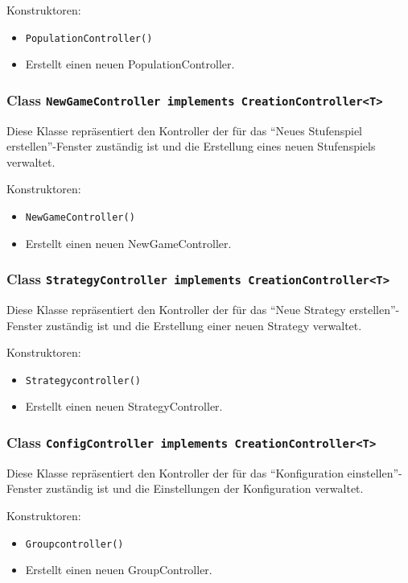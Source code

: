 \documentclass[parskip=full,11pt]{scrartcl}
\begin{document}
Konstruktoren:
\begin{itemize}\itemsep -10pt
\item \texttt{PopulationController()}
\item[] Erstellt einen neuen PopulationController.
\end{itemize}

\subsubsection{Class \texttt{NewGameController implements CreationController<T>}}
Diese Klasse repräsentiert den Kontroller der für das \enquote{Neues Stufenspiel erstellen}-Fenster zuständig ist und die Erstellung eines neuen Stufenspiels verwaltet.

Konstruktoren:
\begin{itemize}\itemsep -10pt
\item \texttt{NewGameController()}
\item[] Erstellt einen neuen NewGameController.
\end{itemize}

\subsubsection{Class \texttt{StrategyController implements CreationController<T>}}
Diese Klasse repräsentiert den Kontroller der für das \enquote{Neue Strategy erstellen}-Fenster zuständig ist und die Erstellung einer neuen Strategy verwaltet.

Konstruktoren:
\begin{itemize}\itemsep -10pt
\item \texttt{Strategycontroller()}
\item[] Erstellt einen neuen StrategyController.
\end{itemize}

\subsubsection{Class \texttt{ConfigController implements CreationController<T>}}
Diese Klasse repräsentiert den Kontroller der für das \enquote{Konfiguration einstellen}-Fenster zuständig ist und die Einstellungen der Konfiguration verwaltet.

Konstruktoren:
\begin{itemize}\itemsep -10pt
\item \texttt{Groupcontroller()}
\item[] Erstellt einen neuen GroupController.
\end{itemize}
\end{document}
